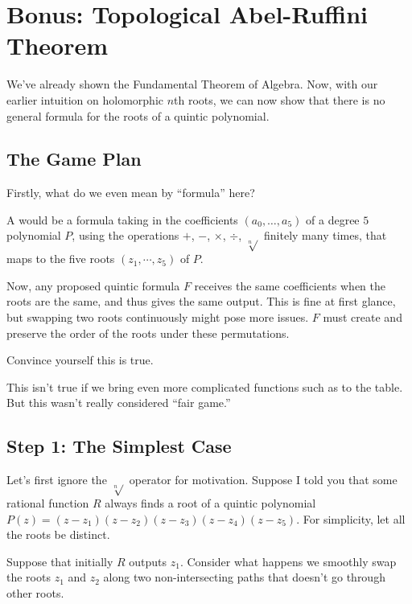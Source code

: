 \chapter{Bonus: Topological Abel-Ruffini Theorem}
We've already shown the Fundamental Theorem of Algebra.
Now, with our earlier intuition on holomorphic $n$th roots,
we can now show that there is no general formula for
the roots of a quintic polynomial.

\section{The Game Plan}
Firstly, what do we even mean by ``formula'' here?

\begin{definition}
	A  would be a formula taking in the coefficients
	$(a_0, \dots, a_5)$ of a degree $5$ polynomial $P$,
	using the operations $+$, $-$, $\times$, $\div$, $\sqrt[n]{}$
	finitely many times, that maps to the five roots $(z_1, \cdots, z_5)$ of $P$.
\end{definition}

Now, any proposed quintic formula $F$ receives the same coefficients when the roots are the same,
and thus gives the same output. This is fine at first glance, but swapping two roots continuously
might pose more issues. $F$ must create and preserve the order of the roots under these permutations.

\begin{ques}
	Convince yourself this is true.
\end{ques}

\begin{remark}
	This isn't true if we bring even more complicated functions
	such as  to the table.
	But this wasn't really considered ``fair game.''
\end{remark}

\section{Step 1: The Simplest Case}
Let's first ignore the $\sqrt[n]{}$ operator for motivation.
Suppose I told you that some rational function $R$ always finds
a root of a quintic polynomial $P(z) = (z - z_1)(z - z_2)(z - z_3)(z - z_4)(z - z_5)$.
For simplicity, let all the roots be distinct.

Suppose that initially $R$ outputs $z_1$. Consider what happens we smoothly swap the roots $z_1$ and $z_2$
along two non-intersecting paths that doesn't go through other roots.

